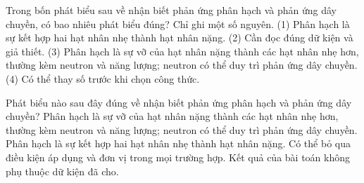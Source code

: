 \begin{ex}
Trong bốn phát biểu sau về nhận biết phản ứng phân hạch và phản ứng dây chuyền, có bao nhiêu phát biểu đúng? Chỉ ghi một số nguyên. (1) Phân hạch là sự kết hợp hai hạt nhân nhẹ thành hạt nhân nặng. (2) Cần đọc đúng dữ kiện và giả thiết. (3) Phân hạch là sự vỡ của hạt nhân nặng thành các hạt nhân nhẹ hơn, thường kèm neutron và năng lượng; neutron có thể duy trì phản ứng dây chuyền. (4) Có thể thay số trước khi chọn công thức.
\end{ex}

\begin{ex}
Phát biểu nào sau đây đúng về nhận biết phản ứng phân hạch và phản ứng dây chuyền?
\choice
{\True Phân hạch là sự vỡ của hạt nhân nặng thành các hạt nhân nhẹ hơn, thường kèm neutron và năng lượng; neutron có thể duy trì phản ứng dây chuyền.}
{Phân hạch là sự kết hợp hai hạt nhân nhẹ thành hạt nhân nặng.}
{Có thể bỏ qua điều kiện áp dụng và đơn vị trong mọi trường hợp.}
{Kết quả của bài toán không phụ thuộc dữ kiện đã cho.}
\end{ex}

